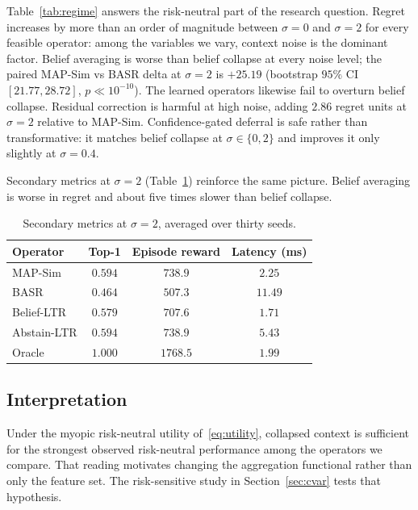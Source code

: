 \documentclass[journal]{IEEEtran}
\begin{document}
Table~\ref{tab:regime} answers the risk-neutral part of the research question.
Regret increases by more than an order of magnitude between \(\sigma=0\) and \(\sigma=2\) for every feasible operator: among the variables we vary, context noise is the dominant factor.
Belief averaging is worse than belief collapse at every noise level; the paired MAP-Sim vs BASR delta at \(\sigma=2\) is \(+25.19\) (bootstrap \(95\%\) CI \([21.77,28.72]\), \(p\ll 10^{-10}\)).
The learned operators likewise fail to overturn belief collapse.
Residual correction is harmful at high noise, adding \(2.86\) regret units at \(\sigma=2\) relative to MAP-Sim.
Confidence-gated deferral is safe rather than transformative: it matches belief collapse at \(\sigma\in\{0,2\}\) and improves it only slightly at \(\sigma=0.4\).

Secondary metrics at \(\sigma=2\) (Table~\ref{tab:secondary}) reinforce the same picture.
Belief averaging is worse in regret and about five times slower than belief collapse.

\begin{table}[t]
\centering
\caption{Secondary metrics at \(\sigma=2\), averaged over thirty seeds.}
\label{tab:secondary}
\footnotesize
\begin{tabular}{@{}lccc@{}}
\toprule
Operator & Top-1 & Episode reward & Latency (ms) \\
\midrule
MAP-Sim & \(0.594\) & \(738.9\) & \(2.25\) \\
BASR & \(0.464\) & \(507.3\) & \(11.49\) \\
Belief-LTR & \(0.579\) & \(707.6\) & \(1.71\) \\
Abstain-LTR & \(0.594\) & \(738.9\) & \(5.43\) \\
Oracle & \(1.000\) & \(1768.5\) & \(1.99\) \\
\bottomrule
\end{tabular}
\end{table}

\subsection{Interpretation}
\label{sec:interpretation}

Under the myopic risk-neutral utility of~\eqref{eq:utility}, collapsed context is sufficient for the strongest observed risk-neutral performance among the operators we compare.
That reading motivates changing the aggregation functional rather than only the feature set.
The risk-sensitive study in Section~\ref{sec:cvar} tests that hypothesis.
\end{document}
